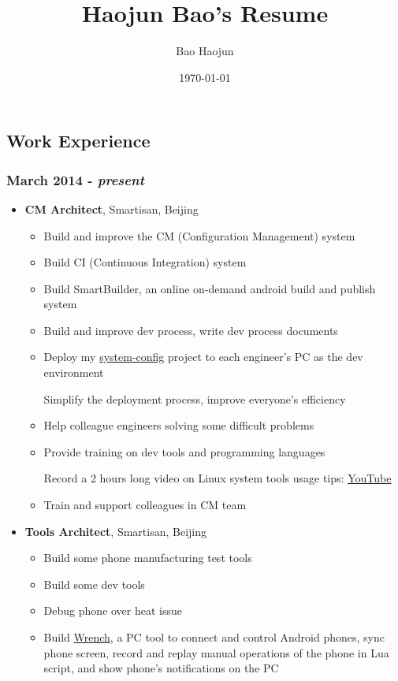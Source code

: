 \documentclass[11pt,dvipdfmx,CJKbookmarks]{article}
\author{Bao Haojun}
\date{\today}
\title{Haojun Bao's Resume}
\begin{document}
\begin{CJK*}{UTF8}{simsun}

\maketitle
{}

\section{Work Experience}
\label{sec:orgf041611}
\subsubsection{March 2014 - \emph{present}}
\label{sec:org2f3a074}
\begin{itemize}
\item \textbf{CM Architect}, Smartisan, Beijing
\begin{itemize}
\item Build and improve the CM (Configuration Management) system
\item Build CI (Continuous Integration) system
\item Build SmartBuilder, an online on-demand android build and publish system
\item Build and improve dev process, write dev process documents
\item Deploy my \href{https://github.com/baohaojun/system-config}{system-config} project to each engineer's PC as the dev environment

Simplify the deployment process, improve everyone's efficiency

\item Help colleague engineers solving some difficult problems
\item Provide training on dev tools and programming languages

Record a 2 hours long video on Linux system tools usage tips: \href{https://www.youtube.com/watch?v\%3Dqp2b3-Guej0}{YouTube}

\item Train and support colleagues in CM team
\end{itemize}

\item \textbf{Tools Architect}, Smartisan, Beijing

\begin{itemize}
\item Build some phone manufacturing test tools
\item Build some dev tools
\item Debug phone over heat issue
\item Build \href{https://github.com/SmartisanTech/Wrench}{Wrench}, a PC tool to connect and control Android phones, sync phone screen, record and replay manual operations of the phone in Lua script, and show phone's notifications on the PC
\end{itemize}
\end{itemize}


\end{CJK*}
\end{document}
